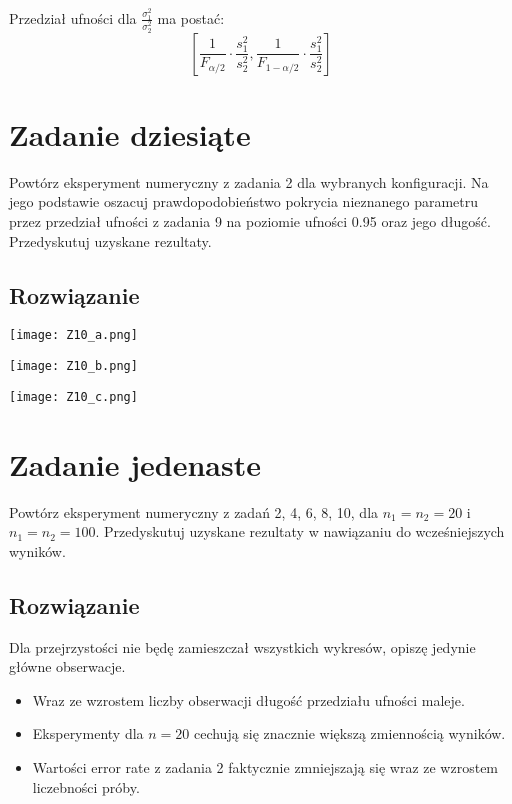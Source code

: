 \documentclass[a4paper]{article}
\begin{document}
Przedział ufności dla $\frac{\sigma_1^2}{\sigma_2^2}$ ma postać:
$$\left[\frac{1}{F_{\alpha/2}}\cdot\frac{s_1^2}{s_2^2},\frac{1}{F_{1-\alpha/2}}\cdot\frac{s_1^2}{s_2^2}\right]$$




\section{Zadanie dziesiąte}
Powtórz eksperyment numeryczny z zadania 2 dla wybranych konfiguracji. Na jego podstawie oszacuj prawdopodobieństwo pokrycia nieznanego parametru przez przedział ufności z zadania 9 na poziomie ufności 0.95 oraz jego długość. Przedyskutuj uzyskane rezultaty.


\subsection{Rozwiązanie}

\texttt{[image: Z10\_a.png]}

\texttt{[image: Z10\_b.png]}

\texttt{[image: Z10\_c.png]}


\section{Zadanie jedenaste}
Powtórz eksperyment numeryczny z zadań 2, 4, 6, 8, 10, dla $n_1=n_2=20$ i $n_1=n_2=100$. Przedyskutuj uzyskane rezultaty w nawiązaniu do wcześniejszych wyników.

\subsection{Rozwiązanie}

Dla przejrzystości nie będę zamieszczał wszystkich wykresów, opiszę jedynie główne obserwacje.
\begin{itemize}
\item Wraz ze wzrostem liczby obserwacji długość przedziału ufności maleje.
\item Eksperymenty dla $n=20$ cechują się znacznie większą zmiennością wyników.
\item Wartości error rate z zadania 2 faktycznie zmniejszają się wraz ze wzrostem liczebności próby.
\end{itemize}
\end{document}
